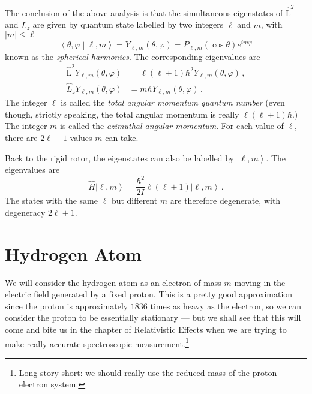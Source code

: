 \documentclass{article}
\theoremstyle{plain}\theoremheaderfont{\normalfont\itshape}\theorembodyfont{\rmfamily}\theoremseparator{.}\newtheorem*{rem}{Remark}\newtheorem*{ex}{Example}\newtheorem*{proof}{Proof}\newtheorem*{altp}{Alternative proof}
\theoremstyle{plain}\theoremheaderfont{\normalfont\bfseries}\theorembodyfont{\rmfamily}\theoremseparator{.}\newtheorem{thm}{Theorem}[section]\newtheorem{lem}[thm]{Lemma}\newtheorem{prop}[thm]{Proposition}\newtheorem*{cor}{Corollary}\newtheorem{defn}[thm]{Definition}\newtheorem{clm}[thm]{Claim}\newtheorem{clminproof}{Claim}
\theoremstyle{break}\theoremheaderfont{\normalfont\itshape}\theorembodyfont{\rmfamily}\theoremseparator{.\medskip}\newtheorem*{proofskip}{Proof}\newtheorem*{exs}{Examples}\newtheorem*{rems}{Remarks}
\theoremstyle{break}\theoremheaderfont{\normalfont\bfseries}\theorembodyfont{\rmfamily}\theoremseparator{.\medskip}\newtheorem{lemskip}[thm]{Lemma}\newtheorem{defnskip}[thm]{Definition}\newtheorem{propskip}[thm]{Proposition}\newtheorem{thmskip}[thm]{Theorem}
\numberwithin{equation}{section}
\newcommand{\ket}[1]{\left| #1 \right\rangle}
\newcommand{\braket}[2]{\left\langle #1 \middle| #2 \right\rangle}
\newcommand{\vb}[1]{\bm{\mathrm{#1}}}
\newcommand{\abs}[1]{\left| #1 \right|}
\begin{document}
    The conclusion of the above analysis is that the simultaneous eigenstates of \(\hat{\vb{L}}^2\) and \(\hat{L}_z\) are given by quantum state labelled by two integers \(\ell\) and \(m\), with \(\abs{m}\le\ell\)
    \begin{equation}
        \braket{\theta,\varphi}{\ell,m}=Y_{\ell,m}(\theta,\varphi)=P_{\ell,m}(\cos\theta)e^{im\varphi}
    \end{equation}
    known as the \textit{spherical harmonics}. The corresponding eigenvalues are
    \begin{align*}
        \hat{\vb{L}}^2Y_{\ell,m}(\theta,\varphi)&=\ell(\ell+1)\hbar^2 Y_{\ell,m}(\theta,\varphi)\,,\\
        \hat{L}_z Y_{\ell,m}(\theta,\varphi)&=m\hbar Y_{\ell,m}(\theta,\varphi)\,.
    \end{align*}
    The integer \(\ell\) is called the \textit{total angular momentum quantum number} (even though, strictly speaking, the total angular momentum is really \(\ell(\ell+1)\hbar\).) The integer \(m\) is called the \textit{azimuthal angular momentum}. For each value of \(\ell\), there are \(2\ell+1\) values \(m\) can take.

    Back to the rigid rotor, the eigenstates can also be labelled by \(\ket{\ell,m}\). The eigenvalues are
    \begin{equation}
        \hat{H}\ket{\ell,m}=\frac{\hbar^2}{2I}\ell(\ell+1)\ket{\ell,m}\,.
    \end{equation}
    The states with the same \(\ell\) but different \(m\) are therefore degenerate, with degeneracy \(2\ell+1\).

    \newpage
    \section{Hydrogen Atom}
    We will consider the hydrogen atom as an electron of mass \(m\) moving in the electric field generated by a fixed proton. This is a pretty good approximation since the proton is approximately \(1836\) times as heavy as the electron, so we can consider the proton to be essentially stationary --- but we shall see that this will come and bite us in the chapter of Relativistic Effects when we are trying to make really accurate spectroscopic measurement.\footnote{Long story short: we should really use the reduced mass of the proton-electron system.}
\end{document}
